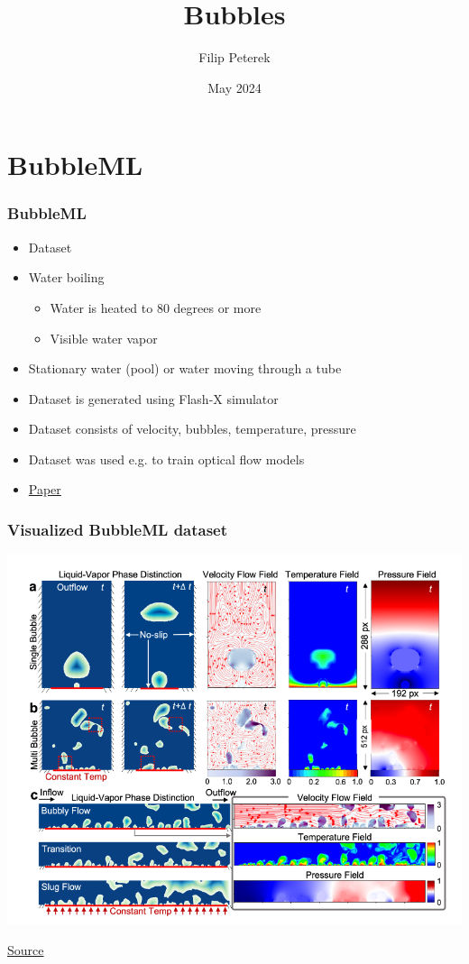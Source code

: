\documentclass{beamer}
\title{Bubbles}
\author{Filip Peterek}
\institute{V\v{S}B-TUO}
\date{May 2024}
\begin{document}
\frame{\titlepage}

\section{BubbleML}

\begin{frame}
    \frametitle{BubbleML}
    \begin{itemize}
        \item Dataset
        \item Water boiling
        \begin{itemize}
            \item Water is heated to 80 degrees or more
            \item Visible water vapor
        \end{itemize}
        \item Stationary water (pool) or water moving through a tube
        \item Dataset is generated using Flash-X simulator
        \item Dataset consists of velocity, bubbles, temperature, pressure
        \item Dataset was used e.g. to train optical flow models
        \item \href{https://arxiv.org/pdf/2307.14623}{Paper}
    \end{itemize}
\end{frame}

\begin{frame}
    \frametitle{Visualized BubbleML dataset}
    \begin{center}
        \includegraphics[width=0.8\columnwidth]{bubble-ml}
    \end{center}
    \href{https://arxiv.org/pdf/2307.14623}{Source}
\end{frame}
\end{document}
